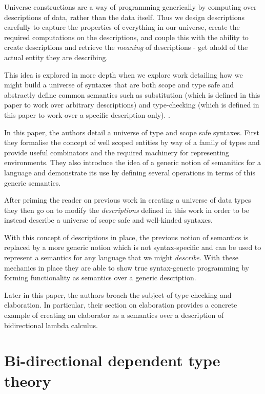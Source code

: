 Universe constructions are a way of programming generically by
computing over descriptions of data, rather than the data itself. Thus
we design descriptions carefully to capture the properties of
everything in our universe, create the required computations on the
descriptions, and couple this with the ability to create descriptions
and retrieve the \emph{meaning} of descriptions - get ahold of
the actual entity they are describing.

This idea is explored in more depth when we
explore work detailing how we might build a universe of
syntaxes that are both scope and type safe and abstractly
define common semantics such as substitution (which is defined in this
paper to work over arbitrary descriptions) and type-checking (which is
defined in this paper to work over a specific description only).
\cite{DBLP:journals/corr/abs-2001-11001}.

In this paper, the authors detail a universe of type and scope safe
syntaxes. First they formalise the concept of well scoped entities by
way of a family of types and provide useful combinators and the required machinery
for representing environments. They also introduce the idea of a
generic notion of semanitics for a language and demonstrate its use by
defining several operations in terms of this generic semantics.

After priming the reader on previous work in creating a universe of
data types \cite{DBLP:conf/icfp/ChapmanDMM10} they then go on to
modify the \emph{descriptions} defined in this work in order to be instead
describe a universe of scope safe and well-kinded syntaxes.

With this concept of descriptions in place, the previous notion of
semantics is replaced by a more generic notion which is not
syntax-specific and can be used to represent a semantics for any
language that we might \emph{describe}. With these mechanics
in place they are able to show true syntax-generic programming by
forming functionality as semantics over a generic description.

Later in this paper, the authors broach the subject of type-checking
and elaboration. In particular, their section on elaboration provides
a concrete example of creating an elaborator as a semantics over a
description of bidirectional lambda calculus.

\section{Bi-directional dependent type theory}

